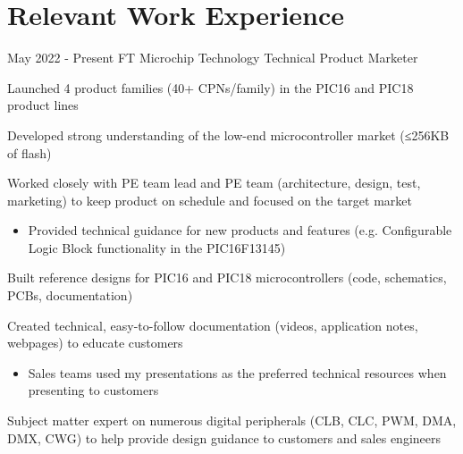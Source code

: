 \documentclass[
	12pt, %
]{FreemanCV}
\begin{document}
\section{Relevant Work Experience}
\jobentry
	{May 2022 - Present} %
	{FT} %
	{Microchip Technology} %
	{Technical Product Marketer} %
	{ %
		\item Launched 4 product families (40+ CPNs/family) in the PIC16 and PIC18 product lines
		\item Developed strong understanding of the low-end microcontroller market (≤256KB of flash) %
		\item Worked closely with PE team lead and PE team (architecture, design, test, marketing) to keep product on schedule and focused on the target market
		\begin{itemize}[topsep=-10pt, leftmargin=10pt, label=\(\circ\)]
			\item Provided technical guidance for new products and features (e.g. Configurable Logic Block functionality in the PIC16F13145)
		\end{itemize}
		\item Built reference designs for PIC16 and PIC18 microcontrollers (code, schematics, PCBs, documentation)
		\item Created technical, easy-to-follow documentation (videos, application notes, webpages) to educate customers 
		\begin{itemize}[topsep=-10pt, leftmargin=10pt, label=\(\circ\)]
			\item Sales teams used my presentations as the preferred technical resources when presenting to customers
			\end{itemize}
		\item Subject matter expert on numerous digital peripherals (CLB, CLC, PWM, DMA, DMX, CWG) to help provide design guidance to customers and sales engineers

}
\end{document}
